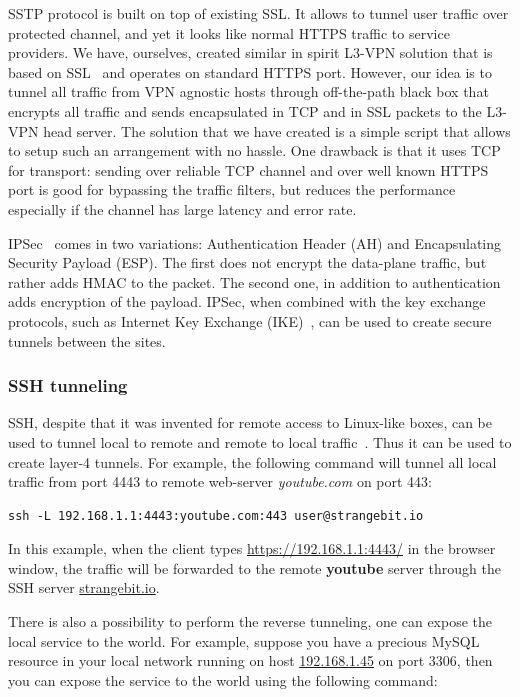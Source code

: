 SSTP protocol is built on top of existing SSL. It allows to tunnel user traffic over protected 
channel, and yet it looks like normal HTTPS traffic to service providers.
We have, ourselves, created similar in spirit L3-VPN solution that is based on SSL~\cite{ssl:vpn}
and operates on standard HTTPS port. However, our idea is to tunnel all traffic from VPN 
agnostic hosts through off-the-path black box that encrypts all traffic and sends encapsulated in TCP and in SSL
packets to the L3-VPN head server. The solution that we have created is a simple script 
that allows to setup such an arrangement with no hassle. One drawback is that it 
uses TCP for transport: sending over reliable TCP channel and over well known HTTPS port
is good for bypassing the traffic filters, but reduces the performance especially if
the channel has large latency and error rate. 

IPSec~\cite{tcpip} comes in two variations: Authentication Header (AH) and Encapsulating Security Payload (ESP).
The first does not encrypt the data-plane traffic, but rather adds HMAC to the packet. The second one, in
addition to authentication adds encryption of the payload. IPSec, when combined with the key exchange 
protocols, such as Internet Key Exchange (IKE)~\cite{rfc4306}, can be used to create secure tunnels between the sites.

\subsubsection{SSH tunneling}

SSH, despite that it was invented for remote access to Linux-like boxes, can be used 
to tunnel local to remote and remote to local traffic~\cite{ssh:tunneling}. Thus it can be used to create
layer-4 tunnels. For example, the following command will tunnel all local traffic from
port 4443 to remote web-server {\it youtube.com} on port 443:

\begin{verbatim}
ssh -L 192.168.1.1:4443:youtube.com:443 user@strangebit.io
\end{verbatim}

In this example, when the client types \url{https://192.168.1.1:4443/} in the browser window,
the traffic will be forwarded to the remote {\bf youtube} server through the SSH server \url{strangebit.io}.

There is also a possibility to perform the reverse tunneling, \ie one can expose the local service to the world.
For example, suppose you have a precious MySQL resource in your local network running on host \url{192.168.1.45} 
on port $3306$, then you can expose the service to the world using the following command:

